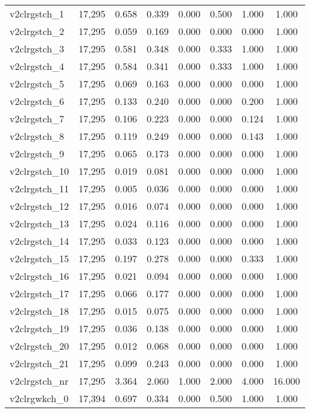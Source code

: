 \begin{table}[!htbp]
\begin{tabular}{@{\extracolsep{5pt}}lccccccc}
v2clrgstch\_1 & 17,295 & 0.658 & 0.339 & 0.000 & 0.500 & 1.000 & 1.000 \\ 
v2clrgstch\_2 & 17,295 & 0.059 & 0.169 & 0.000 & 0.000 & 0.000 & 1.000 \\ 
v2clrgstch\_3 & 17,295 & 0.581 & 0.348 & 0.000 & 0.333 & 1.000 & 1.000 \\ 
v2clrgstch\_4 & 17,295 & 0.584 & 0.341 & 0.000 & 0.333 & 1.000 & 1.000 \\ 
v2clrgstch\_5 & 17,295 & 0.069 & 0.163 & 0.000 & 0.000 & 0.000 & 1.000 \\ 
v2clrgstch\_6 & 17,295 & 0.133 & 0.240 & 0.000 & 0.000 & 0.200 & 1.000 \\ 
v2clrgstch\_7 & 17,295 & 0.106 & 0.223 & 0.000 & 0.000 & 0.124 & 1.000 \\ 
v2clrgstch\_8 & 17,295 & 0.119 & 0.249 & 0.000 & 0.000 & 0.143 & 1.000 \\ 
v2clrgstch\_9 & 17,295 & 0.065 & 0.173 & 0.000 & 0.000 & 0.000 & 1.000 \\ 
v2clrgstch\_10 & 17,295 & 0.019 & 0.081 & 0.000 & 0.000 & 0.000 & 1.000 \\ 
v2clrgstch\_11 & 17,295 & 0.005 & 0.036 & 0.000 & 0.000 & 0.000 & 1.000 \\ 
v2clrgstch\_12 & 17,295 & 0.016 & 0.074 & 0.000 & 0.000 & 0.000 & 1.000 \\ 
v2clrgstch\_13 & 17,295 & 0.024 & 0.116 & 0.000 & 0.000 & 0.000 & 1.000 \\ 
v2clrgstch\_14 & 17,295 & 0.033 & 0.123 & 0.000 & 0.000 & 0.000 & 1.000 \\ 
v2clrgstch\_15 & 17,295 & 0.197 & 0.278 & 0.000 & 0.000 & 0.333 & 1.000 \\ 
v2clrgstch\_16 & 17,295 & 0.021 & 0.094 & 0.000 & 0.000 & 0.000 & 1.000 \\ 
v2clrgstch\_17 & 17,295 & 0.066 & 0.177 & 0.000 & 0.000 & 0.000 & 1.000 \\ 
v2clrgstch\_18 & 17,295 & 0.015 & 0.075 & 0.000 & 0.000 & 0.000 & 1.000 \\ 
v2clrgstch\_19 & 17,295 & 0.036 & 0.138 & 0.000 & 0.000 & 0.000 & 1.000 \\ 
v2clrgstch\_20 & 17,295 & 0.012 & 0.068 & 0.000 & 0.000 & 0.000 & 1.000 \\ 
v2clrgstch\_21 & 17,295 & 0.099 & 0.243 & 0.000 & 0.000 & 0.000 & 1.000 \\ 
v2clrgstch\_nr & 17,295 & 3.364 & 2.060 & 1.000 & 2.000 & 4.000 & 16.000 \\ 
v2clrgwkch\_0 & 17,394 & 0.697 & 0.334 & 0.000 & 0.500 & 1.000 & 1.000 \\ 

\end{tabular}
\end{table}
